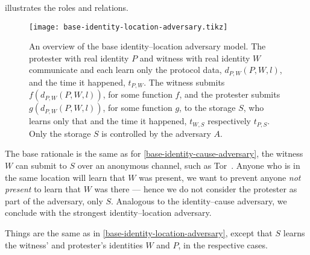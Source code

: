  illustrates the roles and relations.

\begin{figure}
  \centering
  \texttt{[image: base-identity-location-adversary.tikz]}
  \caption{\label{fig:identity-location-adversary}%
    An overview of the base identity--location adversary model.
    The protester with real identity \(P\) and witness with real identity \(W\) 
    communicate and each learn only the protocol data, \(d_{P,W}(P, W, l)\), 
    and the time it happened, \(t_{P,W}\).
    The witness submits \(f(d_{P,W}(P, W, l))\), for some function \(f\), and 
    the protester submits \(g(d_{P,W}(P, W, l))\), for some function \(g\), to 
    the storage \(S\), who learns only that and the time it happened, 
    \(t_{W,S}\) respectively \(t_{P,S}\).
    Only the storage \(S\) is controlled by the adversary \(A\).
  }
\end{figure}

The base rationale is the same as for \cref{base-identity-cause-adversary}, the 
witness \(W\) can submit to \(S\) over an anonymous channel, such as Tor~\cite{Tor}.
Anyone who is in the same location will learn that \(W\) was present, we want 
to prevent anyone \emph{not present} to learn that \(W\) was there --- hence we 
do not consider the protester as part of the adversary, only \(S\).
Analogous to the identity--cause adversary, we conclude with the strongest 
identity--location adversary.

\begin{definition}%
  \label{strongest-identity-location-adversary}
  Things are the same as in \cref{base-identity-location-adversary}, except 
  that \(S\) learns the witness' and protester's identities \(W\) and \(P\), in 
  the respective cases.
\end{definition}
